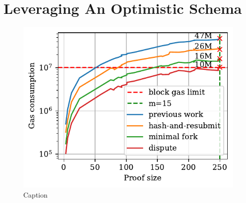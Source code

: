 \section{Leveraging An Optimistic Schema}



\begin{figure}[!h]
    \begin{center}
        \includegraphics[width=1\columnwidth]{figures/dispute-phase.pdf}
    \end{center}
    \caption{Caption}
    \label{fig:chains}
\end{figure}
